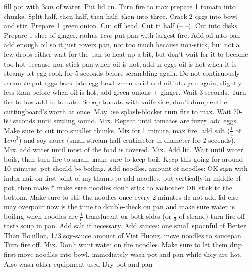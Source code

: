 \documentclass[10pt, twocolumn]{recipe}
\begin{document}
\begin{procedure}
\Step fill pot with $3cm$ of water. Put lid on. Turn fire to max
\Step prepare 1 tomato into chunks. Split half, then half, then half, then into three. Crack 2 eggs into bowl and stir. Prepare 1 green onion. Cut off head. Cut in half (-- --). Cut into disks. Prepare 1 slice of ginger, radius $1cm$
\Step put pan with largest fire. Add oil into pan
\Note add enough oil so it just covers pan, not too much because non-stick, but not a few drops either
\Note wait for the pan to heat up a bit, but don't wait for it to become too hot because non-stick pan
\Step when oil is hot, add in eggs
\Note oil is hot when it is steamy
\Note let egg cook for 5 seconds before scrambling again. Do not continuously scramble
\Step put eggs back into egg bowl when solid
\Step add oil into pan again, slightly less than before
\Step when oil is hot, add green onions + ginger. Wait 3 seconds. Turn fire to low
\Step add in tomato. Scoop tomato with knife side, don't dump entire cuttingboard's worth at once. May use splash-blocker
\Step turn fire to max. Wait 30-60 seconds until sizzling sound. Mix. Repeat until tomatos are fuzzy.
\Step add eggs. Make sure to cut into smaller chunks. Mix for 1 minute, max fire.
\Step add salt ($\frac{1}{4}$ of $1cm^3$) and soy-sauce (small stream half-centimeter in diameter for 2 seconds). Mix.
\Step add water until most of the food is covered. Mix. Add lid. Wait until water boils, then turn fire to small, make sure to keep boil. Keep this going for around 10 minutes.
\Step pot should be boiling. Add noodles.
\Note amount of noodles: OK sign with index nail on first joint of my thumb
\Note to add noodles, put vertically in middle of pot, then make *
\Note make sure noodles don't stick to eachother OR stick to the bottom. Make sure to stir the noodles once every 2 minutes
\Note do not add lid else may overpour
\Note now is the time to double-check on pan and make sure water is boiling
\Step when noodles are $\frac{1}{6}$ translucent on both sides (or $\frac{1}{3}$ of strand) turn fire off
\Step taste soup in pan. Add salt if necessary. Add sauces: one small spoonful of Better Than Bouillon, 1/3 soy-sauce amount of Viet Huong.
\Step move noodles to saucepan. Turn fire off. Mix.
\Note Don't want water on the noodles. Make sure to let them drip first
\Step move noodles into bowl.
\Step immediately wash pot and pan while they are hot. Also wash other equipment used
\Note Dry pot and pan


\end{procedure}
\end{document}
